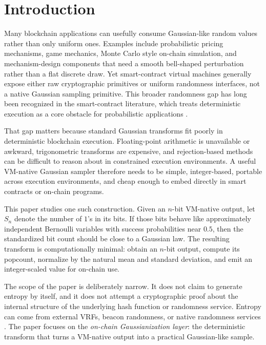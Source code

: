 \documentclass[11pt]{article}
\begin{document}
\section{Introduction}

Many blockchain applications can usefully consume Gaussian-like random values
rather than only uniform ones. Examples include probabilistic pricing
mechanisms, game mechanics, Monte Carlo style on-chain simulation, and
mechanism-design components that need a smooth bell-shaped perturbation rather
than a flat discrete draw. Yet smart-contract virtual machines generally expose
either raw cryptographic primitives or uniform randomness interfaces, not a
native Gaussian sampling primitive. This broader randomness gap has long been
recognized in the smart-contract literature, which treats deterministic
execution as a core obstacle for probabilistic applications
\citep{Chatterjee2019,NativeVRF2023}.

That gap matters because standard Gaussian transforms fit poorly in
deterministic blockchain execution. Floating-point arithmetic is unavailable or
awkward, trigonometric transforms are expensive, and rejection-based methods
can be difficult to reason about in constrained execution environments. A
useful VM-native Gaussian sampler therefore needs to be simple, integer-based,
portable across execution environments, and cheap enough to embed directly in
smart contracts or on-chain programs.

This paper studies one such construction. Given an $n$-bit VM-native output,
let $S_n$ denote the number of $1$'s in its bits. If those bits behave like
approximately independent Bernoulli variables with success probabilities near
$0.5$, then the standardized bit count should be close to a Gaussian law. The
resulting transform is computationally minimal: obtain an $n$-bit output,
compute its popcount, normalize by the natural mean and standard deviation, and
emit an integer-scaled value for on-chain use.

The scope of the paper is deliberately narrow. It does not claim to generate
entropy by itself, and it does not attempt a cryptographic proof about the
internal structure of the underlying hash function or randomness service.
Entropy can come from external VRFs, beacon randomness, or native randomness
services \citep{Micali1999,ChainlinkVRF,EIP4399,SuiRandomnessDocs}. The paper
focuses on the \emph{on-chain Gaussianization layer}: the deterministic
transform that turns a VM-native output into a practical Gaussian-like sample.
\end{document}
